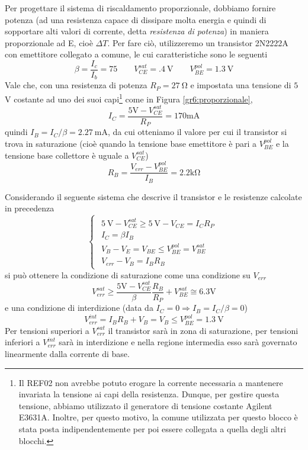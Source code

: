 Per progettare il sistema di riscaldamento proporzionale, dobbiamo fornire potenza (ad una resistenza capace di dissipare molta energia e quindi di sopportare alti valori di corrente, detta \textit{resistenza di potenza}) in maniera proporzionale ad E, cioè $\Delta T$.
Per fare ciò, utilizzeremo un transistor 2N2222A con emettitore collegato a comune, le cui caratteristiche sono le seguenti
$$\beta=\frac{I_c}{I_b}=75 \qquad V_{CE}^{sat}=\SI{.4}{\volt} \qquad V_{BE}^{pol}=\SI{1.3}{\volt}$$
Vale che, con una resistenza di potenza $R_{P} = \SI{27}{\ohm}$ e impostata una tensione di $5$ \si{\volt} costante ad uno dei suoi capi\footnote{Il REF02 non avrebbe potuto erogare la corrente necessaria a mantenere invariata la tensione ai capi della resistenza.
Dunque, per gestire questa tensione, abbiamo utilizzato il generatore di tensione costante Agilent E3631A.
Inoltre, per questo motivo, la comune utilizzata per questo blocco è stata posta indipendentemente per poi essere collegata a quella degli altri blocchi.} come in Figura \ref{gr6:proporzionale},
$$I_{C}=\frac{5 \si{\volt}- V_{CE}^{sat}}{R_P}=170 \si{\milli\ampere}$$
quindi $I_B=I_{C}/\beta=\SI{2.27}{\mA}$, da cui otteniamo il valore per cui il transistor si trova in saturazione (cioè quando la tensione base emettitore è pari a $V_{BE}^{pol}$ e la tensione base collettore è uguale a $V_{CE}^{sat}$)
$$R_B=\frac{V_{err} - V_{BE}^{pol}}{I_B}=2.2 \si{\kilo\ohm}$$

Considerando il seguente sistema che descrive il transistor e le resistenze calcolate in precedenza
$$
\begin{cases}
\begin{array}{rl}
\SI{5}{\volt}-V_{CE}^{sat} \geq \SI{5}{\volt}-V_{CE} = I_{C}R_P\\
I_C=\beta I_B \\
V_B - V_E = V_{BE} \leq V_{BE}^{pol} = V_{BE}^{sat}\\
V_{err}-V_B=I_B R_B
\end{array}
\end{cases}
$$
si può ottenere la condizione di saturazione come una condizione su $V_{err}$
\begin{equation}
V_{err}^{sat} \geq \frac{5\si{\volt}-V_{CE}^{sat}}{\beta} \frac{R_B}{R_P}+V_{BE}^{sat} \cong 6.3 \si{\volt}
\label{eq6:saturazione}
\end{equation}
e una condizione di interdizione (data da $I_C = 0 \Rightarrow I_B = I_C / \beta = 0$)
\begin{equation}
V_{err}^{int} = I_B R_B + V_B = V_B \leq V_{BE}^{pol} = \SI{1.3}{\V}
\label{eq6:interdizione}
\end{equation}
Per tensioni superiori a $V_{err}^{sat}$ il transistor sarà in zona di saturazione, per tensioni inferiori a $V_{err}^{int}$ sarà in interdizione e nella regione intermedia esso sarà governato linearmente dalla corrente di base.


